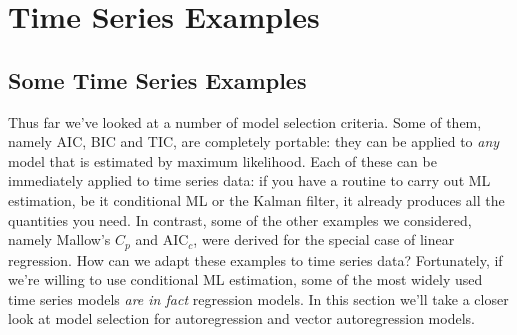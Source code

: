 \chapter{Time Series Examples}

\section{Some Time Series Examples}
Thus far we've looked at a number of model selection criteria. Some of them, namely AIC, BIC and TIC, are completely portable: they can be applied to \emph{any} model that is estimated by maximum likelihood. Each of these can be immediately applied to time series data: if you have a routine to carry out ML estimation, be it conditional ML or the Kalman filter, it already produces all the quantities you need. In contrast, some of the other examples we considered, namely Mallow's $C_p$ and AIC$_c$, were derived for the special case of linear regression. How can we adapt these examples to time series data? Fortunately, if we're willing to use conditional ML estimation, some of the most widely used time series models \emph{are in fact} regression models. In this section we'll take a closer look at model selection for autoregression and vector autoregression models.


